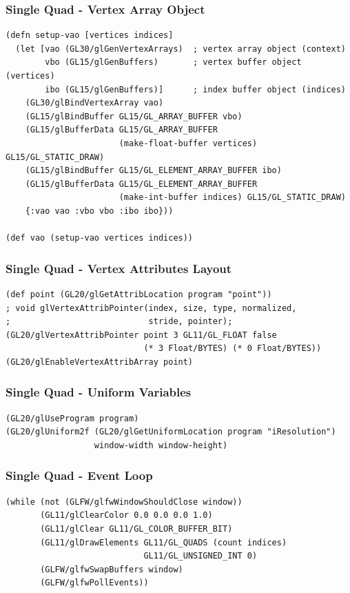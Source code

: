 \documentclass[aspectratio=169,11pt,xcolor=dvipsnames]{beamer}
\begin{document}
\begin{frame}[fragile]
  \frametitle{Single Quad {-} Vertex Array Object}
  \begin{verbatim}
(defn setup-vao [vertices indices]
  (let [vao (GL30/glGenVertexArrays)  ; vertex array object (context)
        vbo (GL15/glGenBuffers)       ; vertex buffer object (vertices)
        ibo (GL15/glGenBuffers)]      ; index buffer object (indices)
    (GL30/glBindVertexArray vao)
    (GL15/glBindBuffer GL15/GL_ARRAY_BUFFER vbo)
    (GL15/glBufferData GL15/GL_ARRAY_BUFFER
                       (make-float-buffer vertices) GL15/GL_STATIC_DRAW)
    (GL15/glBindBuffer GL15/GL_ELEMENT_ARRAY_BUFFER ibo)
    (GL15/glBufferData GL15/GL_ELEMENT_ARRAY_BUFFER
                       (make-int-buffer indices) GL15/GL_STATIC_DRAW)
    {:vao vao :vbo vbo :ibo ibo}))

(def vao (setup-vao vertices indices))
  \end{verbatim}
\end{frame}

\begin{frame}[fragile]
  \frametitle{Single Quad {-} Vertex Attributes Layout}
  \begin{verbatim}
(def point (GL20/glGetAttribLocation program "point"))
; void glVertexAttribPointer(index, size, type, normalized,
;                            stride, pointer);
(GL20/glVertexAttribPointer point 3 GL11/GL_FLOAT false
                            (* 3 Float/BYTES) (* 0 Float/BYTES))
(GL20/glEnableVertexAttribArray point)
  \end{verbatim}
\end{frame}

\begin{frame}[fragile]
  \frametitle{Single Quad {-} Uniform Variables}
  \begin{verbatim}
(GL20/glUseProgram program)
(GL20/glUniform2f (GL20/glGetUniformLocation program "iResolution")
                  window-width window-height)
  \end{verbatim}
\end{frame}

\begin{frame}[fragile]
  \frametitle{Single Quad {-} Event Loop}
  \begin{verbatim}
(while (not (GLFW/glfwWindowShouldClose window))
       (GL11/glClearColor 0.0 0.0 0.0 1.0)
       (GL11/glClear GL11/GL_COLOR_BUFFER_BIT)
       (GL11/glDrawElements GL11/GL_QUADS (count indices)
                            GL11/GL_UNSIGNED_INT 0)
       (GLFW/glfwSwapBuffers window)
       (GLFW/glfwPollEvents))
  \end{verbatim}
\end{frame}
\end{document}
